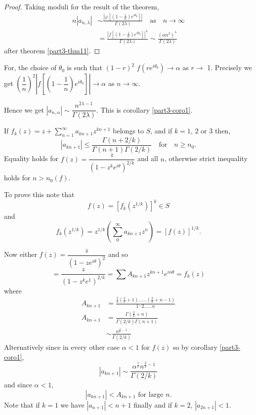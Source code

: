 \begin{proof}
Taking moduli for the result of the theorem,
\begin{align*}
n|a_{n,\lambda}| &\sim
\frac{|\varphi\left[\left(1-\frac{1}{n}\right)e^{i\theta_{0}}\right]|}{\Gamma(2\lambda)}\quad\text{as}\quad
n\to \infty\\
&=
\frac{|f\left[\left(1-\frac{1}{n}\right)e^{i\theta_{0}}\right]|^{\lambda}}{\Gamma(2\lambda)}\sim
\frac{(\alpha n^{2})^{\lambda}}{\Gamma(2\lambda)} 
\end{align*}
after theorem \ref{part3-thm11}.
\end{proof}

For, the choice of $\theta_{0}$ is such that $(1-r)^{2}$
$f(re^{i\theta_{0}})\to \alpha$ as $r \to$ 1. Precisely we get
$\left(\dfrac{1}{n}\right)^{2}\left|f\left[\left(1-\dfrac{1}{n}\right)e^{i\theta_{0}}\right]\right|\to
\alpha$ as $n\to \infty$.

Hence we get $|a_{n,\alpha}|\sim
\dfrac{n^{2\lambda-1}}{\Gamma(2\lambda)}$. This is corollary
\ref{part3-coro1}.

\begin{cor}\label{part3-cor2}
If $f_{k}(z)=z+\sum\limits^{\infty}_{n=1}a_{kn+1}z^{kn+1}$ belongs to
$S$, and if $k=1$, $2$ or $3$ then,
$$
|a_{kn+1}|\leq
\frac{\Gamma(n+2/k)}{\Gamma(n+1)\Gamma(2/k)}\quad\text{for}\quad n\geq
n_{0}. 
$$\pageoriginale
Equality holds for $f(z)=\dfrac{z}{(1-z^{k}e^{i\theta})^{2/k}}$ and
all $n$, otherwise strict inequality holds for $n>n_{0}(f)$.
\end{cor}

To prove this note that 
$$f(z)=[f_{k}(z^{1/k})]^{k}\in S$$ 
and
$$f_{k}(z^{1/k})=z^{1/k}(\sum\limits^{\infty}_{0}a_{kn+1}z^{n})=[f(z)]^{1/k}.$$ 

Now either $f(z)=\dfrac{z}{(1-ze^{i\theta})^{2}}$ and so
$$
=\frac{z}{(1-z^{k}e^{1})^{2/k}}=\sum
A_{kn+1}z^{kn+1}e^{in\theta}=f_{k}(z)
$$
where 
\begin{align*}
A_{kn+1} &= \frac{\frac{2}{k}\left(\frac{2}{k}+1\right)\ldots\ldots
  \left(\frac{2}{k}+n-1\right)}{1\cdot 2\ldots\ldots n}\\
A_{kn+1} &=
\frac{\Gamma\left(\frac{2}{k}+n\right)}{\Gamma(2/k)\Gamma(n+1)}\\
&\sim \frac{n^{\frac{2}{k}-1}}{\Gamma(2/k)}
\end{align*}
Alternatively since in every other case $\alpha<1$ for $f(z)$ so by
corollary \ref{part3-coro1},
$$
|a_{kn+1}|\sim
\frac{\alpha^{\frac{1}{k}}n^{\frac{2}{k}-1}}{\Gamma(2/k)}
$$
and since $\alpha<1$,
$$
|a_{kn+1}|<A_{kn+1}\text{ \  for large \ } n.
$$
Note that if $k=1$ we have $|a_{n+1}|<n+1$ finally and if $k=2$,
$|a_{2n+1}|<1$.\pageoriginale

